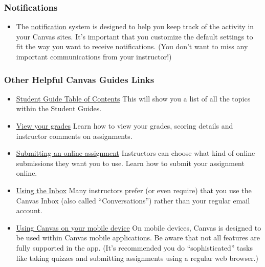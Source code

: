 \hypertarget{notifications}{%
\subsubsection{Notifications}\label{notifications}}

\begin{itemize}
\tightlist
\item
  The \href{https://community.canvaslms.com/t5/Student-Guide/How-do-I-manage-my-Canvas-notification-settings-as-a-student/ta-p/434}{notification} system is designed to help you keep track of the activity in your Canvas sites. It's important that you customize the default settings to fit the way you want to receive notifications. (You don't want to miss any important communications from your instructor!)
\end{itemize}

\hypertarget{other-helpful-canvas-guides-links}{%
\subsubsection{Other Helpful Canvas Guides Links}\label{other-helpful-canvas-guides-links}}

\begin{itemize}
\item
  \href{https://community.canvaslms.com/t5/Student-Guide/tkb-p/student}{Student Guide Table of Contents}
  This will show you a list of all the topics within the Student Guides.
\item
  \href{https://community.canvaslms.com/t5/Student-Guide/How-do-I-view-my-grades-in-a-current-course/ta-p/493}{View your grades}
  Learn how to view your grades, scoring details and instructor comments on assignments.
\item
  \href{https://community.canvaslms.com/t5/Student-Guide/How-do-I-submit-an-online-assignment/ta-p/503}{Submitting an online assignment}
  Instructors can choose what kind of online submissions they want you to use. Learn how to submit your assignment online.
\item
  \href{https://community.canvaslms.com/t5/Student-Guide/How-do-I-use-the-Inbox-as-a-student/ta-p/532}{Using the Inbox}
  Many instructors prefer (or even require) that you use the Canvas Inbox (also called ``Conversations'') rather than your regular email account.
\item
  \href{https://community.canvaslms.com/t5/Student-Guide/How-can-I-use-Canvas-on-my-mobile-device-as-a-student/ta-p/282}{Using Canvas on your mobile device}
  On mobile devices, Canvas is designed to be used within Canvas mobile applications. Be aware that not all features are fully supported in the app. (It's recommended you do ``sophisticated'' tasks like taking quizzes and submitting assignments using a regular web browser.)
\end{itemize}

